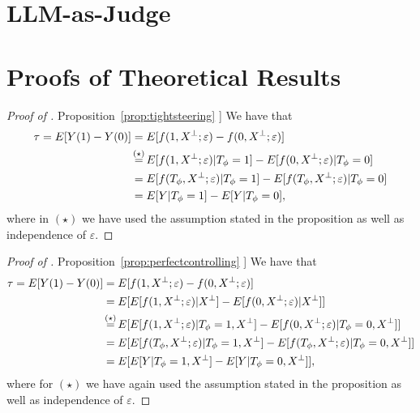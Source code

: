 \documentclass{article}
\theoremstyle{plain}
\theoremstyle{definition}
\theoremstyle{remark}
\newcommand{\myref}[2]{%
    \hyperref[#2]{#1~\ref*{#2}}%
}
\begin{document}
\newpage
\section{LLM-as-Judge}
\label{sec:apxjudgeprompt}


\newpage

\section{Proofs of Theoretical Results}\label{apx:proofs}

\begin{proof}[Proof of \myref{Proposition}{prop:tightsteering}]
    We have that
    \begin{align*}
        \tau = E[Y(1) - Y(0)]
        &=
        E[f(1,X^\perp;\varepsilon) - f(0,X^\perp;\varepsilon)]
        \\
        &\stackrel{\mathclap{(\star)}}{=}
        E[f(1,X^\perp;\varepsilon)|T_\phi=1] - E[f(0,X^\perp;\varepsilon)|T_\phi=0]
        \\
        &=
        E[f(T_\phi,X^\perp;\varepsilon)|T_\phi=1] - E[f(T_\phi,X^\perp;\varepsilon)|T_\phi=0] \\
        &=
        E[Y|T_\phi=1] - E[Y|T_\phi=0],
    \end{align*}
    where in $(\star)$ we have used the assumption stated in the proposition as well as independence of $\varepsilon$.
\end{proof}

\begin{proof}[Proof of \myref{Proposition}{prop:perfectcontrolling}]
   We have that
    \begin{align*}
        \tau = E[Y(1) - Y(0)]
        &=
        E[f(1,X^\perp;\varepsilon) - f(0,X^\perp;\varepsilon)]
        \\
        &=
        E[E[f(1,X^\perp;\varepsilon)|X^\perp] - E[f(0,X^\perp;\varepsilon)|X^\perp]]
        \\
        &\stackrel{\mathclap{(\star)}}{=}
        E[E[f(1,X^\perp;\varepsilon)|T_\phi=1, X^\perp] - E[f(0,X^\perp;\varepsilon)|T_\phi=0, X^\perp]]
        \\
        &=
        E[E[f(T_\phi,X^\perp;\varepsilon)|T_\phi=1, X^\perp] - E[f(T_\phi,X^\perp;\varepsilon)|T_\phi=0, X^\perp]] \\
        &=
        E[E[Y|T_\phi=1, X^\perp] - E[Y|T_\phi=0, X^\perp]],
    \end{align*}
        where for $(\star)$ we have again used the assumption stated in the proposition as well as independence of $\varepsilon$.
\end{proof}
\end{document}
